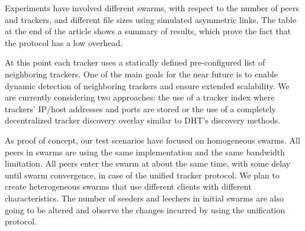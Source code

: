 Experiments have involved different swarms, with respect to the number of
peers and trackers, and different file sizes using simulated asymmetric links.
The table at the end of the article shows a summary of results, which prove
the fact that the protocol has a low overhead.

At this point each tracker uses a statically defined pre-configured list of
neighboring trackers. One of the main goals for the near future is to enable
dynamic detection of neighboring trackers and ensure extended scalability. We
are currently considering two approaches: the use of a tracker index where
trackers' IP/host addresses and ports are stored or the use of a completely
decentralized tracker discovery overlay similar to DHT's discovery methods.

As proof of concept, our test scenarios have focused on homogeneous swarms.
All peers in swarms are using the same implementation and the same bandwidth
limitation. All peers enter the swarm at about the same time, with some delay
until swarm convergence, in case of the unified tracker protocol. We plan to
create heterogeneous swarms that use different clients with different
characteristics. The number of seeders and leechers in initial swarms are also
going to be altered and observe the changes incurred by using the unification
protocol.

